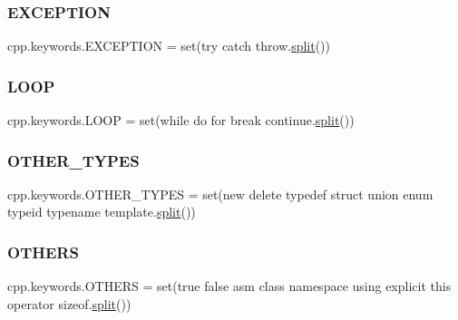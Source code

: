 \mbox{\label{namespacecpp_1_1keywords_a2665fb8a25a4dae03fa5d3dc975c537c}} 
\subsubsection{\texorpdfstring{EXCEPTION}{EXCEPTION}}
{\footnotesize\ttfamily cpp.\+keywords.\+E\+X\+C\+E\+P\+T\+I\+ON = set(\textquotesingle{}try catch throw\textquotesingle{}.\mbox{\hyperlink{_input_8h_aec2fd8cd9140a1b535dc54a924396f40}{split}}())}

\mbox{\label{namespacecpp_1_1keywords_af0164c05398a2291487b76414102d555}} 
\subsubsection{\texorpdfstring{LOOP}{LOOP}}
{\footnotesize\ttfamily cpp.\+keywords.\+L\+O\+OP = set(\textquotesingle{}while do for break continue\textquotesingle{}.\mbox{\hyperlink{_input_8h_aec2fd8cd9140a1b535dc54a924396f40}{split}}())}

\mbox{\label{namespacecpp_1_1keywords_aa86a5e35a3ace14022a5ca1b91baf207}} 
\subsubsection{\texorpdfstring{OTHER\_TYPES}{OTHER\_TYPES}}
{\footnotesize\ttfamily cpp.\+keywords.\+O\+T\+H\+E\+R\+\_\+\+T\+Y\+P\+ES = set(\textquotesingle{}new delete typedef struct union enum typeid typename template\textquotesingle{}.\mbox{\hyperlink{_input_8h_aec2fd8cd9140a1b535dc54a924396f40}{split}}())}

\mbox{\label{namespacecpp_1_1keywords_a15fe231fbad145538b73892804898809}} 
\subsubsection{\texorpdfstring{OTHERS}{OTHERS}}
{\footnotesize\ttfamily cpp.\+keywords.\+O\+T\+H\+E\+RS = set(\textquotesingle{}true false asm class namespace using explicit this operator sizeof\textquotesingle{}.\mbox{\hyperlink{_input_8h_aec2fd8cd9140a1b535dc54a924396f40}{split}}())}


